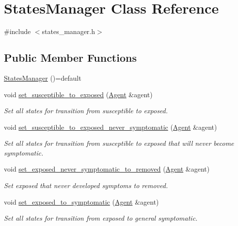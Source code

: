 \hypertarget{classStatesManager}{}\section{States\+Manager Class Reference}
\label{classStatesManager}


{\ttfamily \#include $<$states\+\_\+manager.\+h$>$}

\subsection*{Public Member Functions}
\begin{DoxyCompactItemize}
\item 
\hyperlink{classStatesManager_a9aa295a6122b9501a24e3ef4449c660f}{States\+Manager} ()=default
\item 
void \hyperlink{classStatesManager_a3b2001cf1da5e448c7d2f08bba30d05b}{set\+\_\+susceptible\+\_\+to\+\_\+exposed} (\hyperlink{classAgent}{Agent} \&agent)
\begin{DoxyCompactList}\small\item\em Set all states for transition from susceptible to exposed. \end{DoxyCompactList}\item 
void \hyperlink{classStatesManager_a1d6cbcb237b03565c83f4f618da08cbe}{set\+\_\+susceptible\+\_\+to\+\_\+exposed\+\_\+never\+\_\+symptomatic} (\hyperlink{classAgent}{Agent} \&agent)
\begin{DoxyCompactList}\small\item\em Set all states for transition from susceptible to exposed that will never become symptomatic. \end{DoxyCompactList}\item 
void \hyperlink{classStatesManager_a70153bfe33b4fde44c950a0d6eac5191}{set\+\_\+exposed\+\_\+never\+\_\+symptomatic\+\_\+to\+\_\+removed} (\hyperlink{classAgent}{Agent} \&agent)
\begin{DoxyCompactList}\small\item\em Set exposed that never developed symptoms to removed. \end{DoxyCompactList}\item 
void \hyperlink{classStatesManager_a675b30619c98f0c4743d08aba0567dad}{set\+\_\+exposed\+\_\+to\+\_\+symptomatic} (\hyperlink{classAgent}{Agent} \&agent)
\begin{DoxyCompactList}\small\item\em Set all states for transition from exposed to general symptomatic. \end{DoxyCompactList}\item 

\end{DoxyCompactItemize}
